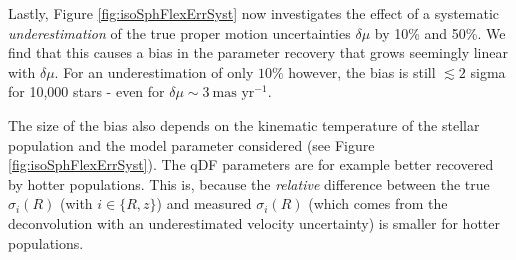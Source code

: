 \begin{figure}[!htbp]
\label{fig:isoSphFlexMixDiff}
\end{figure}


Lastly, Figure \ref{fig:isoSphFlexErrSyst} now investigates the effect of a systematic \emph{underestimation} of the true proper motion uncertainties $\delta \mu$ by 10\% and 50\%. We find that this causes a bias in the parameter recovery that grows seemingly linear with $\delta \mu$. For an underestimation of only $10\%$ however, the bias is still $\lesssim 2$ sigma for 10,000 stars \Wilma{[TO DO: Check]} - even for $\delta \mu \sim 3~\text{mas yr}^{-1}$.

The size of the bias also depends on the kinematic temperature of the stellar population and the model parameter considered (see Figure \ref{fig:isoSphFlexErrSyst}). The qDF parameters are for example better recovered by hotter populations. This is, because the \emph{relative} difference between the true $\sigma_i(R)$ (with $i \in \{R,z\}$) and measured $\sigma_i(R)$ (which comes from the deconvolution with an underestimated velocity uncertainty) is smaller for hotter populations. 
